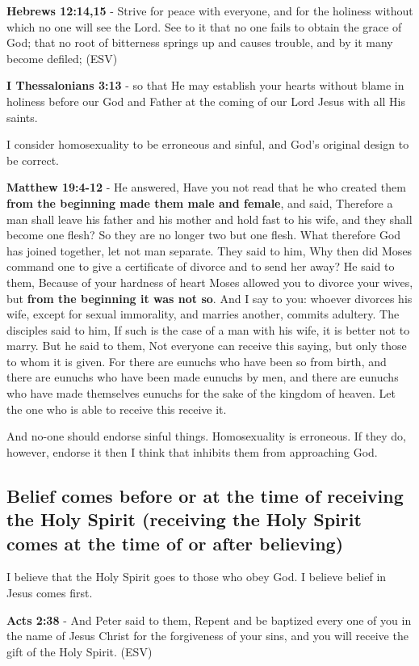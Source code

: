 \documentclass[11pt]{article}
\begin{document}
\textbf{Hebrews 12:14,15} -  Strive for peace with everyone, and for the holiness without which no one will see the Lord.  See to it that no one fails to obtain the grace of God; that no root of bitterness springs up and causes trouble, and by it many become defiled;  (ESV)

\textbf{I Thessalonians 3:13} - so that He may establish your hearts without blame in holiness before our God and Father at the coming of our Lord Jesus with all His saints.

I consider homosexuality to be erroneous and sinful, and God's original design to be correct.

\textbf{Matthew 19:4-12} - He answered, Have you not read that he who created them \textbf{from the beginning made them male and female}, and said, Therefore a man shall leave his father and his mother and hold fast to his wife, and they shall become one flesh?  So they are no longer two but one flesh. What therefore God has joined together, let not man separate.  They said to him, Why then did Moses command one to give a certificate of divorce and to send her away?  He said to them, Because of your hardness of heart Moses allowed you to divorce your wives, but \textbf{from the beginning it was not so}.  And I say to you: whoever divorces his wife, except for sexual immorality, and marries another, commits adultery.  The disciples said to him, If such is the case of a man with his wife, it is better not to marry.  But he said to them, Not everyone can receive this saying, but only those to whom it is given.  For there are eunuchs who have been so from birth, and there are eunuchs who have been made eunuchs by men, and there are eunuchs who have made themselves eunuchs for the sake of the kingdom of heaven. Let the one who is able to receive this receive it.

And no-one should endorse sinful things. Homosexuality is erroneous.
If they do, however, endorse it then I think that inhibits them from approaching God.

\subsection{Belief comes before or at the time of receiving the Holy Spirit (receiving the Holy Spirit comes at the time of or after believing)}
\label{sec:org47fdddd}
I believe that the Holy Spirit goes to those who obey God. I believe belief in Jesus comes first.

\textbf{Acts 2:38} - And Peter said to them, Repent and be baptized every one of you in the name of Jesus Christ for the forgiveness of your sins, and you will receive the gift of the Holy Spirit. (ESV)
\end{document}
